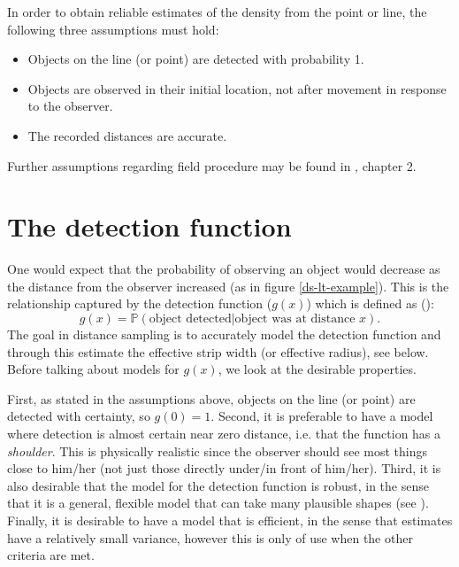 In order to obtain reliable estimates of the density from the point or line, the following three assumptions must hold:
\begin{itemize}
	\item Objects on the line (or point) are detected with probability 1.
	\item Objects are observed in their initial location, not after movement in response to the observer.
	\item The recorded distances are accurate.
\end{itemize}
Further assumptions regarding field procedure may be found in , chapter 2. 

\section{The detection function}
\label{intro-ds-detfct}

One would expect that the probability of observing an object\label{cor-7s3} would decrease as the distance from the observer increased (as in figure \ref{ds-lt-example}\label{cor-7s4}). This is the relationship captured by the detection function ($g(x)$) which is defined as (\cite[p. 10]{IDS}):
\begin{equation}
g(x)=\mathbb{P} (\text{object detected} | \text{object was at distance } x).
\label{ds-wordyeqn}
\end{equation}
The goal in distance sampling is to accurately model the detection function and through this estimate the effective strip width (or effective radius), see  below. Before talking about models for $g(x)$, we look at the desirable properties.

First, as stated in the assumptions above, objects on the line (or point) are detected with certainty, so $g(0)=1$. Second, it is preferable to have a model where detection is almost certain near zero distance, i.e. that the function has a \textit{shoulder}. This is physically realistic since the observer should see most things close to him/her (not just those directly under/in front of him/her). Third, it is also desirable that the model for the detection function is robust, in the sense that it is a general, flexible model that can take many plausible shapes (see \cite[p. 41]{IDS}). Finally, it is desirable to have a model that is efficient, in the sense that estimates have a relatively small variance, however this is only of use when the other criteria are met.

